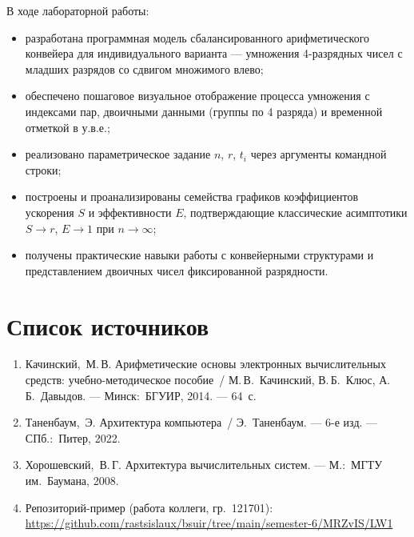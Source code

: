 \documentclass[12pt,a4paper]{article}
\begin{document}
В ходе лабораторной работы:
\begin{itemize}[leftmargin=*,itemsep=2pt]
  \item разработана программная модель сбалансированного
        арифметического конвейера для индивидуального варианта
        --- умножения 4-разрядных чисел с младших разрядов
        со сдвигом множимого влево;
  \item обеспечено пошаговое визуальное отображение процесса
        умножения с индексами пар, двоичными данными (группы
        по 4 разряда) и временной отметкой в у.в.е.;
  \item реализовано параметрическое задание $n$, $r$, $t_i$
        через аргументы командной строки;
  \item построены и проанализированы семейства графиков
        коэффициентов ускорения $S$ и эффективности $E$,
        подтверждающие классические асимптотики $S \to r$,
        $E \to 1$ при $n \to \infty$;
  \item получены практические навыки работы с конвейерными
        структурами и представлением двоичных чисел
        фиксированной разрядности.
\end{itemize}

\section{Список источников}
\begin{enumerate}[leftmargin=*]
  \item Качинский,~М.\,В. Арифметические основы электронных
        вычислительных средств: учебно-методическое пособие~/
        М.\,В.~Качинский, В.\,Б.~Клюс, А.\,Б.~Давыдов. ---
        Минск:~БГУИР, 2014. --- 64~с.
  \item Таненбаум,~Э. Архитектура компьютера~/ Э.~Таненбаум. ---
        6-е изд. --- СПб.:~Питер, 2022.
  \item Хорошевский,~В.\,Г. Архитектура вычислительных
        систем. --- М.:~МГТУ им.~Баумана, 2008.
  \item Репозиторий-пример (работа коллеги, гр.~121701):
        \url{https://github.com/rastsislaux/bsuir/tree/main/semester-6/MRZvIS/LW1}
\end{enumerate}
\end{document}
